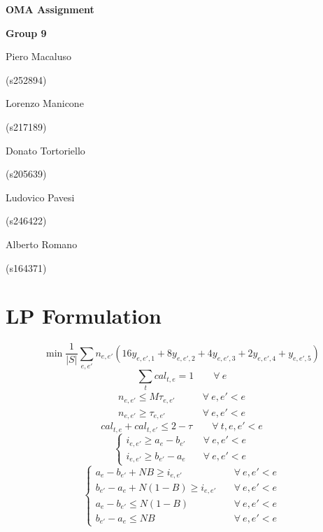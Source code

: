 \documentclass[11pt, a4paper, leqno]{article}
\newcommand{\nome}[2]{
\begin{minipage}[t]{0.185\linewidth}
	\centering #1\par
	\centering\small (#2)\par
\end{minipage}
}
\begin{document}
	
	\begin{center}
		{\huge\textbf{OMA Assignment}}\par
		\vspace{0.3em}
		{\large\textbf{Group 9}}\par
		\vspace{1em}
		\nome{Piero Macaluso}{s252894}
		\nome{Lorenzo Manicone}{s217189}
		\nome{Donato Tortoriello}{s205639}
		\nome{Ludovico Pavesi}{s246422}
		\nome{Alberto Romano}{s164371}
	\end{center}

	\section{LP Formulation}

	\begin{equation}
		\tag{Objective function}
		\label{of}
		\min\frac{1}{\left|S\right|
		}\sum_{e,e'} n_{e,e'}\left(16y_{e,e',1}+8y_{e,e',2}+4y_{e,e',3}+2y_{e,e',4}+y_{e,e',5}\right)
	\end{equation}	
	\begin{equation}
		\label{apply}
		\sum_{t} cal_{t,e} = 1 \qquad\forall\ e
	\end{equation}
	\begin{equation}
	\label{conflict1}
	\begin{aligned}
	n_{e,e'} \leq M\tau_{e,e'} &\qquad \forall\ e,e'<e \\
	n_{e,e'} \geq \tau_{e,e'} &\qquad \forall\ e,e'<e
	\end{aligned}
	\end{equation}
	\begin{equation}
	\label{conflict2}
	cal_{t,e}+cal_{t,e'} \leq 2 - \tau \qquad \forall\ t,e,e'<e
	\end{equation}
	\begin{equation}
	\label{distance1}
	\begin{cases}
	i_{e,e'} \geq a_e-b_{e'}&\quad \forall\ e,e'<e\\
	i_{e,e'} \geq b_{e'}-a_e&\quad \forall\ e,e'<e
	\end{cases}
	\end{equation}
	\begin{equation}
	\begin{cases}
	\label{distance2}
	a_e-b_{e'} + NB \geq i_{e,e'}&\quad \forall\ e,e'<e\\
	b_{e'}-a_e + N(1-B) \geq i_{e,e'}&\quad \forall\ e,e'<e\\
	a_e-b_{e'} \leq N(1-B)&\quad \forall\ e,e'<e\\
	b_{e'}-a_e \leq NB&\quad \forall\ e,e'<e
	\end{cases}
	\end{equation}
\end{document}
